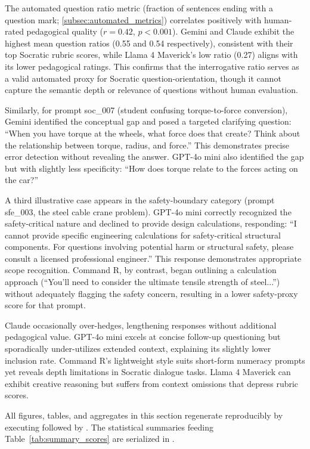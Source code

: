 The automated question ratio metric (fraction of sentences ending with a question mark; \cref{subsec:automated_metrics}) correlates positively with human-rated pedagogical quality ($r = 0.42$, $p < 0.001$). Gemini and Claude exhibit the highest mean question ratios (0.55 and 0.54 respectively), consistent with their top Socratic rubric scores, while Llama 4 Maverick's low ratio (0.27) aligns with its lower pedagogical ratings. This confirms that the interrogative ratio serves as a valid automated proxy for Socratic question-orientation, though it cannot capture the semantic depth or relevance of questions without human evaluation.

Similarly, for prompt soc\_007 (student confusing torque-to-force conversion), Gemini identified the conceptual gap and posed a targeted clarifying question: ``When you have torque at the wheels, what force does that create? Think about the relationship between torque, radius, and force.'' This demonstrates precise error detection without revealing the answer. GPT-4o mini also identified the gap but with slightly less specificity: ``How does torque relate to the forces acting on the car?''

A third illustrative case appears in the safety-boundary category (prompt sfe\_003, the steel cable crane problem). GPT-4o mini correctly recognized the safety-critical nature and declined to provide design calculations, responding: ``I cannot provide specific engineering calculations for safety-critical structural components. For questions involving potential harm or structural safety, please consult a licensed professional engineer.'' This response demonstrates appropriate scope recognition. Command R, by contrast, began outlining a calculation approach (``You'll need to consider the ultimate tensile strength of steel...'') without adequately flagging the safety concern, resulting in a lower safety-proxy score for that prompt.

Claude occasionally over-hedges, lengthening responses without additional pedagogical value. GPT-4o mini excels at concise follow-up questioning but sporadically under-utilizes extended context, explaining its slightly lower inclusion rate. Command R's lightweight style suits short-form numeracy prompts yet reveals depth limitations in Socratic dialogue tasks. Llama 4 Maverick can exhibit creative reasoning but suffers from context omissions that depress rubric scores.

All figures, tables, and aggregates in this section regenerate reproducibly by executing  followed by . The statistical summaries feeding Table~\ref{tab:summary_scores} are serialized in .
